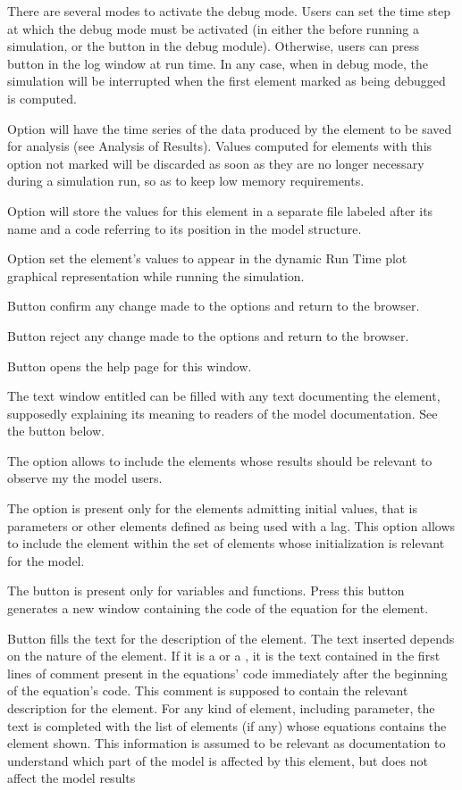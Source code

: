 \documentclass [11pt,a4paper] {book}
\begin{document}
There are several modes to activate the debug mode. Users can set the time step at which the debug mode must be activated (in either the  before running a simulation, or the button  in the debug module). Otherwise, users can press button  in the log window at run time. In any case, when in debug mode, the simulation will be interrupted when the first element marked as being debugged is computed.

Option  will have the time series of the data produced by the element to be saved for analysis (see Analysis of Results). Values computed for elements with this option not marked will be discarded as soon as they are no longer necessary during a simulation run, so as to keep low memory requirements.

Option  will store the values for this element in a separate file labeled after its name and a code referring to its position in the model structure.

Option  set the element's values to appear in the dynamic Run Time plot graphical representation while running the simulation.

Button  confirm any change made to the options and return to the browser.

Button  reject any change made to the options and return to the browser.

Button  opens the help page for this window.

The text window entitled  can be filled with any text documenting the element, supposedly explaining its meaning to readers of the model documentation. See the button  below.

The option  allows to include the elements whose results should be relevant to observe my the model users.

The option  is present only for the elements admitting initial values, that is parameters or other elements defined as being used with a lag. This option allows to include the element within the set of elements whose initialization is relevant for the model.

The button  is present only for variables and functions. Press this button generates a new window containing the code of the equation for the element.

Button  fills the text for the description of the element. The text inserted depends on the nature of the element. If it is a  or a , it is the text contained in the first lines of comment present in the equations' code immediately after the beginning of the equation's code. This comment is supposed to contain the relevant description for the element. For any kind of element, including parameter, the text is completed with the list of elements (if any) whose equations contains the element shown. This information is assumed to be relevant as documentation to understand which part of the model is affected by this element, but does not affect the model results
\end{document}
